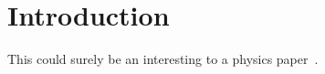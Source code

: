 \section{Introduction}
\label{sec:Introduction}

This could surely be an interesting to a physics paper~\cite{Alves:2008zz}.
